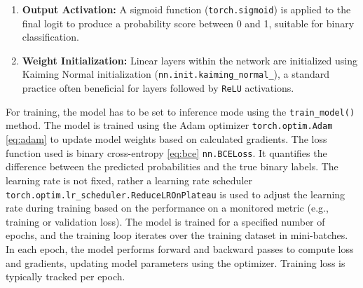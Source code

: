\begin{enumerate}
    \item \textbf{Output Activation:} A sigmoid function (\texttt{torch.sigmoid}) is applied to the final logit to produce a probability score between 0 and 1, suitable for binary classification.

    \item \textbf{Weight Initialization:} Linear layers within the network are initialized using Kaiming Normal initialization (\texttt{nn.init.kaiming\_normal\_}), a standard practice often beneficial for layers followed by \texttt{ReLU} activations.
\end{enumerate}

For training, the model has to be set to inference mode using the \texttt{train\_model()} method. The model is trained using the Adam optimizer \texttt{torch.optim.Adam} \autoref{eq:adam} \autocite{kingma2014adam} to update model weights based on calculated gradients. The loss function used is binary cross-entropy \autoref{eq:bce} \texttt{nn.BCELoss}. It quantifies the difference between the predicted probabilities and the true binary labels. The learning rate is not fixed, rather a learning rate scheduler \texttt{torch.optim.lr\_scheduler.ReduceLROnPlateau} is used to adjust the learning rate during training based on the performance on a monitored metric (e.g., training or validation loss). The model is trained for a specified number of epochs, and the training loop iterates over the training dataset in mini-batches. In each epoch, the model performs forward and backward passes to compute loss and gradients, updating model parameters using the optimizer. Training loss is typically tracked per epoch.

